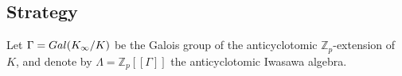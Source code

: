 \documentclass[10pt,reqno]{amsart}
\numberwithin{equation}{section}
\theoremstyle{plain}
\theoremstyle{definition}
\newtheorem{rmk}[thm]{Remark}
\theoremstyle{definition}
\theoremstyle{plain}
\theoremstyle{plain}
\theoremstyle{plain}
\theoremstyle{plain}
\theoremstyle{plain}
\newtheorem{thmintro}{Theorem}
\theoremstyle{plain}
\DeclareMathOperator{\ord}{ord}
\newcommand{\Z}{\mathbb{Z}}
\newcommand{\Q}{\mathbb{Q}}
\newcommand{\Zp}{\mathbb{Z}_{p}}
\newcommand{\X}{\mathfrak{X}}
\newcommand{\sha}{\text{\wncyr{W}}}
\newcommand{\Lcal}{\mathcal{L}}
\newcommand{\rank}{\mathrm{rank}}
\begin{document}



%



\subsection{Strategy} 

Let $\Gamma={\rm Gal}(K_\infty/K)$ be the Galois group of the anticyclotomic $\Z_p$-extension of $K$, and denote by $\Lambda=\Z_p[[\Gamma]]$ the anticyclotomic Iwasawa algebra. 
\end{document}
